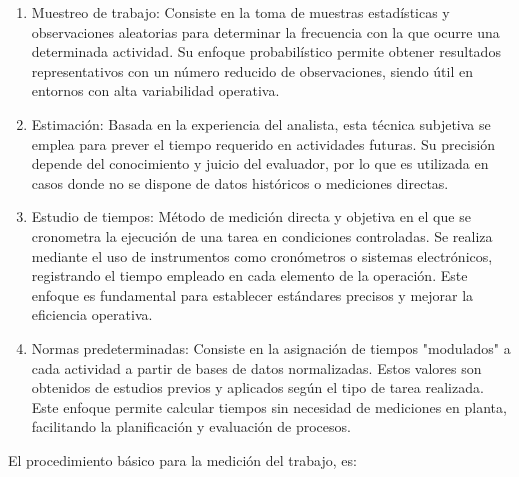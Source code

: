 \documentclass[a4paper,oneside,11pt]{article}
\begin{document}
\begin{enumerate}
    \item Muestreo de trabajo: Consiste en la toma de muestras estadísticas y observaciones aleatorias para determinar la frecuencia con la que ocurre una determinada actividad. Su enfoque probabilístico permite obtener resultados representativos con un número reducido de observaciones, siendo útil en entornos con alta variabilidad operativa.
    \item Estimación: Basada en la experiencia del analista, esta técnica subjetiva se emplea para prever el tiempo requerido en actividades futuras. Su precisión depende del conocimiento y juicio del evaluador, por lo que es utilizada en casos donde no se dispone de datos históricos o mediciones directas.
    \item Estudio de tiempos: Método de medición directa y objetiva en el que se cronometra la ejecución de una tarea en condiciones controladas. Se realiza mediante el uso de instrumentos como cronómetros o sistemas electrónicos, registrando el tiempo empleado en cada elemento de la operación. Este enfoque es fundamental para establecer estándares precisos y mejorar la eficiencia operativa.
    \item Normas predeterminadas: Consiste en la asignación de tiempos "modulados" a cada actividad a partir de bases de datos normalizadas. Estos valores son obtenidos de estudios previos y aplicados según el tipo de tarea realizada. Este enfoque permite calcular tiempos sin necesidad de mediciones en planta, facilitando la planificación y evaluación de procesos.
\end{enumerate}

El procedimiento básico para la medición del trabajo, es:
\end{document}
